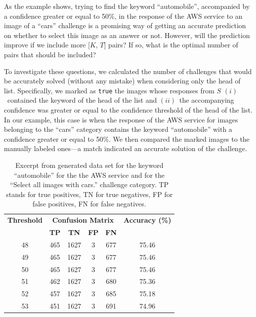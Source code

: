 \documentclass[sigconf,review,anonymous]{acmart}
\begin{document}
As the example shows, trying to find the keyword ``automobile'', accompanied by a confidence greater or equal to 50\%, in the response of the AWS service to an image of a ``cars'' challenge is a promising way of getting an accurate prediction on whether to select this image as an answer or not. However, will the prediction improve if we include more [$K$, $T$] pairs? If so, what is the optimal number of pairs that should be included? 

To investigate these questions, we calculated the number of challenges that would be accurately solved (without any mistake) when considering only the head of list. Specifically, we marked as \texttt{true} the images whose responses from $S$ $(i)$~contained the keyword of the head of the list and $(ii)$~the accompanying confidence was greater or equal to the confidence threshold of the head of the list. In our example, this case is when the response of the AWS service for images belonging to the ``cars'' category contains the keyword ``automobile'' with a confidence greater or equal to 50\%. We then compared the marked images to the manually labeled ones---a match indicated an accurate solution of the challenge.

\begin{table}[t]
\centering
\caption{Excerpt from generated data set for the keyword ``automobile'' for the the AWS service and for the ``Select all images with cars.'' challenge category. TP stands for true positives, TN for true negatives, FP for false positives, FN for false negatives.}
\label{extracted-thresholds-example}
\begin{tabular}{cccccc}
\toprule
\multicolumn{1}{c}{\centering \textbf{Threshold}} & 
\multicolumn{4}{c}{\centering \textbf{Confusion Matrix}} &
\multicolumn{1}{c}{\centering \textbf{Accuracy (\%)}}
\\
\cmidrule(lr){2-5}
 & \textbf{TP}& \textbf{TN}  & \textbf{FP} & \textbf{FN} & 
 \\ 
\midrule
48 & 465 & 1627 & 3  & 677 & 75.46 \\ 
49 & 465 & 1627 & 3  & 677 & 75.46 \\ 
\rowcolor{lightgray} 50 & 465 & 1627 & 3  & 677 & 75.46 \\ 
51 & 462 & 1627 & 3  & 680 & 75.36 \\ 
52 & 457 & 1627 & 3  & 685 & 75.18 \\ 
53 & 451 & 1627 & 3  & 691 & 74.96 \\ 
\bottomrule
\end{tabular}
\end{table}
\end{document}
